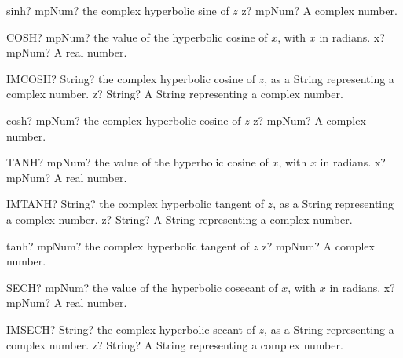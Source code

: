 \documentclass[12pt,a4paper,openany]{book}
\begin{document}
\begin{mpFunctionsExtract}
\mpFunctionOne
{sinh? mpNum? the complex hyperbolic sine of $z$}
{z? mpNum? A complex number.}
\end{mpFunctionsExtract}

\begin{mpFunctionsExtract}
\mpWorksheetFunctionOneNotImplemented
{COSH? mpNum? the value of the hyperbolic cosine of $x$, with $x$ in radians.}
{x? mpNum? A real number.}
\end{mpFunctionsExtract}

\begin{mpFunctionsExtract}
\mpWorksheetFunctionOneNotImplemented
{IMCOSH? String? the complex hyperbolic cosine of $z$, as a String representing a complex number.}
{z? String? A String representing a complex number.}
\end{mpFunctionsExtract}

\begin{mpFunctionsExtract}
\mpFunctionOne
{cosh? mpNum? the complex hyperbolic cosine of $z$}
{z? mpNum? A complex number.}
\end{mpFunctionsExtract}

\begin{mpFunctionsExtract}
\mpWorksheetFunctionOneNotImplemented
{TANH? mpNum? the value of the hyperbolic cosine of $x$, with $x$ in radians.}
{x? mpNum? A real number.}
\end{mpFunctionsExtract}

\begin{mpFunctionsExtract}
\mpWorksheetFunctionOneNotImplemented
{IMTANH? String? the complex hyperbolic tangent of $z$, as a String representing a complex number.}
{z? String? A String representing a complex number.}
\end{mpFunctionsExtract}

\begin{mpFunctionsExtract}
\mpFunctionOne
{tanh? mpNum? the complex hyperbolic tangent of $z$}
{z? mpNum? A complex number.}
\end{mpFunctionsExtract}

\begin{mpFunctionsExtract}
\mpWorksheetFunctionOneNotImplemented
{SECH? mpNum? the value of the hyperbolic cosecant of $x$, with $x$ in radians.}
{x? mpNum? A real number.}
\end{mpFunctionsExtract}

\begin{mpFunctionsExtract}
\mpWorksheetFunctionOneNotImplemented
{IMSECH? String? the complex hyperbolic secant of $z$, as a String representing a complex number.}
{z? String? A String representing a complex number.}
\end{mpFunctionsExtract}
\end{document}
